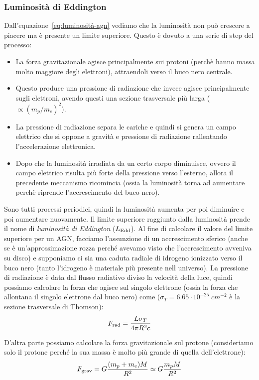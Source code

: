 \subsubsection{Luminosità di Eddington}
Dall'equazione~\eqref{eq:luminosità-agn} vediamo che la luminosità non può crescere a piacere ma è presente un limite superiore. Questo è dovuto a una serie di step del processo:
\begin{itemize}
    \item La forza gravitazionale agisce principalmente sui protoni (perchè hanno massa molto maggiore degli elettroni), attraendoli verso il buco nero centrale.
    \item Questo produce una pressione di radiazione che invece agisce principalmente sugli elettroni, avendo questi una sezione trasversale più larga ($\propto (m_p/m_e)^2$).
    \item La pressione di radiazione separa le cariche e quindi si genera un campo elettrico che si oppone a gravità e pressione di radiazione rallentando l'accelerazione elettronica.
    \item Dopo che la luminosità irradiata da un certo corpo diminuisce, ovvero il campo elettrico risulta più forte della pressione verso l'esterno, allora il precedente meccanismo ricomincia (ossia la luminosità torna ad aumentare perchè riprende l'accrescimento del buco nero).
\end{itemize}
Sono tutti processi periodici, quindi la luminosità aumenta per poi diminuire e poi aumentare nuovamente. Il limite superiore raggiunto dalla luminosità prende il nome di \emph{luminosità di Eddington} ($L_\textup{Edd}$). Al fine di calcolare il valore del limite superiore per un AGN, facciamo l'assunzione di un accrescimento sferico (anche se è un’approssimazione rozza perché avevamo visto che l’accrescimento avveniva su disco) e supponiamo ci sia una caduta radiale di idrogeno ionizzato verso il buco nero (tanto l'idrogeno è materiale più presente nell universo). La pressione di radiazione è data dal flusso radiativo diviso la velocità della luce, quindi possiamo calcolare la forza che agisce sul singolo elettrone (ossia la forza che allontana il singolo elettrone dal buco nero) come ($\sigma_T = 6.65 \cdot 10^{-25} \;\si{cm^{-2}}$ è la sezione trasversale di Thomson):
\begin{equation*}
    F_\textup{rad} = \frac{L\sigma_T}{4\pi R^2 c}
\end{equation*}

D’altra parte possiamo calcolare la forza gravitazionale sul protone (consideriamo solo il protone perché la sua massa è molto più grande di quella dell'elettrone):
\begin{equation*}
    F_\textup{grav} = G\frac{(m_p+m_e)M}{R^2} \simeq G\frac{m_pM}{R^2}
\end{equation*}

